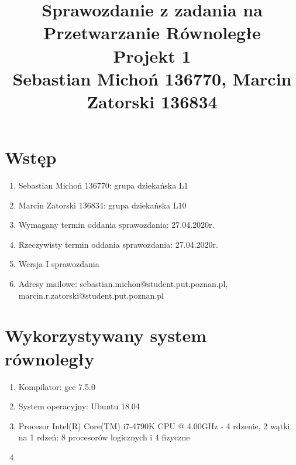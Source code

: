 \documentclass[12pt]{article}
\begin{document}
\title{Sprawozdanie z zadania na Przetwarzanie Równoległe\\
\large Projekt 1\\
\large Sebastian Michoń 136770, Marcin Zatorski 136834}
\date{\vspace{-10ex}}
\maketitle

\section{Wstęp}
\begin {enumerate}
\item Sebastian Michoń 136770: grupa dziekańska L1
\item Marcin Zatorski 136834: grupa dziekańska L10
\item Wymagany termin oddania sprawozdania: 27.04.2020r.
\item Rzeczywisty termin oddania sprawozdania: 27.04.2020r.
\item Wersja I sprawozdania
\item Adresy mailowe: sebastian.michon@student.put.poznan.pl, marcin.r.zatorski@student.put.poznan.pl
\end {enumerate}

\section{Wykorzystywany system równoległy}
\begin {enumerate}
	\item Kompilator: gcc 7.5.0
	\item System operacyjny: Ubuntu 18.04
	\item Procesor Intel(R) Core(TM) i7-4790K CPU @ 4.00GHz - 4 rdzenie, 2 wątki na 1 rdzeń: 8 procesorów logicznych i 4 fizyczne
	\item 
	
\end {enumerate}
\end{document}
